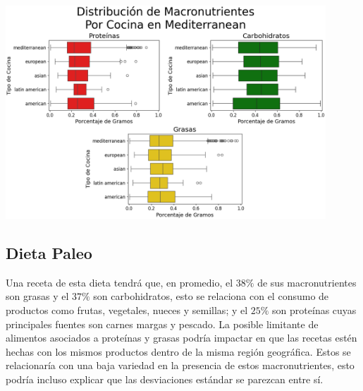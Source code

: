 \documentclass[12pt,a4paper]{article}
\begin{document}
{{            \begin{center}
                \includegraphics[width=0.9\textwidth]{Resources/EDA/Mediterranean_2.png}
            \end{center}
        }

        \subsection{Dieta Paleo}
        {
            Una receta de esta dieta tendrá que, en promedio, el $38\%$ de sus 
            macronutrientes son grasas y el $37\%$ son carbohidratos, esto se 
            relaciona con el consumo de productos como frutas, vegetales, nueces 
            y semillas; y el $25\%$ son proteínas cuyas principales fuentes son 
            carnes margas y pescado. La posible limitante de alimentos asociados 
            a proteínas	y grasas podría impactar en que las recetas estén hechas 
            con los mismos productos dentro de la misma región geográfica. Estos 
            se relacionaría con una baja variedad en la presencia de estos 
            macronutrientes, esto podría incluso explicar que las desviaciones 
            estándar se parezcan entre sí.\\

}}
\end{document}
